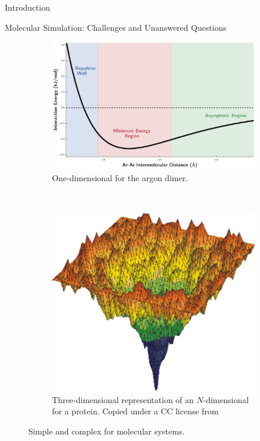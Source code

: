 \begin{chapter}{Introduction}
\begin{section}{Molecular Simulation: Challenges and Unanswered Questions}
\begin{figure}
\centering
    \begin{subfigure}[t]{0.75\textwidth}
        \centering
        \includegraphics[width=1.0\textwidth]{workflow/generalized_pes.pdf}
        \caption{One-dimensional \pes for the argon dimer.}
    \end{subfigure}
    ~ 
    \begin{subfigure}[t]{0.75\textwidth}
        \centering
        \includegraphics[width=1.0\textwidth]{intro/protein_pes.pdf}
        \caption{Three-dimensional representation of an $N$-dimensional \pes
            for a protein. Copied under a CC license from \citet{Chaplin2017} }
    \end{subfigure}%
\caption{Simple and complex  for molecular systems.}
\label{fig:intro-pes}
\end{figure}


\end{section}
\end{chapter}
